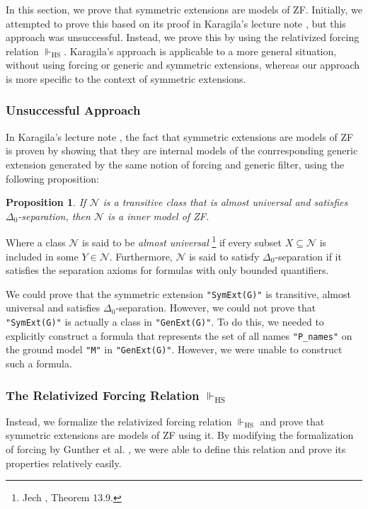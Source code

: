 \documentclass{report}
\newtheorem{prop}[thm]{Proposition}
\begin{document}
In this section, we prove that symmetric extensions are models of ZF.
Initially, we attempted to prove this based on its proof in Karagila's lecture note \cite{karagila},
but this approach was unsuccessful.
Instead, we prove this by using the relativized forcing relation $\Vdash_{\mathrm{HS}}$.
Karagila's approach is applicable to a more general situation,
without using forcing or generic and symmetric extensions,
whereas our approach is more specific to the context of symmetric extensions.

\subsubsection{Unsuccessful Approach}

In Karagila's lecture note \cite{karagila},
the fact that symmetric extensions are models of ZF is proven by showing that 
they are internal models of the conrresponding generic extension
generated by the same notion of forcing and generic filter,
using the following proposition:

\begin{prop}
If $\mathcal{N}$ is a transitive class that is almost universal and satisfies $\Delta_0$-separation, 
then $\mathcal{N}$ is a inner model of ZF.
\end{prop}

Where a class $\mathcal{N}$ is said to be \emph{almost universal} 
\footnote{Jech \cite{jech_set_theory}, Theorem 13.9.}
if every subset $X \subseteq \mathcal{N}$ is included in some $Y \in \mathcal{N}$.
Furthermore, $\mathcal{N}$ is said to satisfy $\Delta_0$-separation if it satisfies the separation axioms for formulas with only bounded quantifiers.

We could prove that the symmetric extension \texttt{"SymExt(G)"} is transitive, almost universal and satisfies $\Delta_0$-separation.
However, we could not prove that \texttt{"SymExt(G)"} is actually a class in \texttt{"GenExt(G)"}.
To do this, we needed to explicitly construct a formula that represents the set of all names \texttt{"P\_names"} on the ground model \texttt{"M"} in \texttt{"GenExt(G)"}.
However, we were unable to construct such a formula.

\subsubsection{The Relativized Forcing Relation $\Vdash_{\mathrm{HS}}$}
Instead, we formalize the relativized forcing relation $\Vdash_{\mathrm{HS}}$ and prove that symmetric extensions are models of ZF using it.
By modifying the formalization of forcing by Gunther et al. \cite{gunther_forcing}, 
we were able to define this relation and prove its properties relatively easily.
\end{document}
